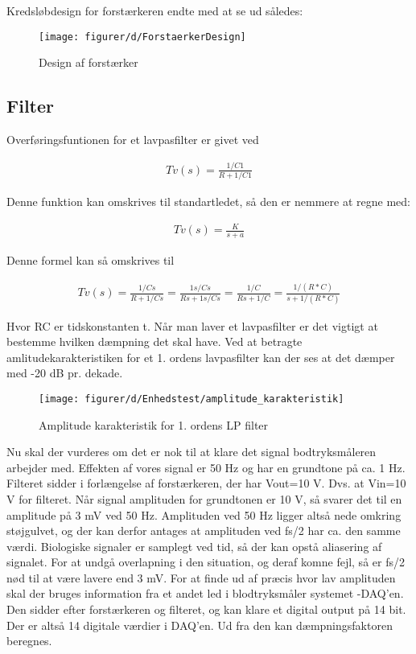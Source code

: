 Kredsløbdesign for forstærkeren endte med at se ud således:

\begin{figure}[H]
    \centering
    \texttt{[image: figurer/d/ForstaerkerDesign]}
    \caption{Design af forstærker}
    \label{figtest_HW2}
\end{figure}

\subsection{Filter}
Overføringsfuntionen for et lavpasfilter er givet ved

\begin{align}
Tv(s)=\frac{{1}/C1}{R+{1}/C1}
\end{align}

Denne funktion kan omskrives til standartledet, så den er nemmere at regne med:

\begin{align}
Tv(s)=\frac{K}{s + a}
\end{align}

Denne formel kan så omskrives til

\begin{align}
Tv(s)=\frac{{1}/Cs}{R+{1}/Cs} = \frac{{1s}/Cs}{Rs+{1s}/Cs} = \frac{{1}/C}{Rs+{1}/C} = \frac{{1}/(R*C)}{s+{1}/(R*C)}
\end{align}

Hvor RC er tidskonstanten t.
Når man laver et lavpasfilter er det vigtigt at bestemme hvilken dæmpning det skal have. 
Ved at betragte amlitudekarakteristiken for et 1. ordens lavpasfilter kan der ses at det dæmper med -20 dB pr. dekade.

\begin{figure}[H]
    \centering
    \texttt{[image: figurer/d/Enhedstest/amplitude\_karakteristik]}
    \caption{Amplitude karakteristik for 1. ordens LP filter}
    \label{figtest_LP}
\end{figure}

Nu skal der vurderes om det er nok til at klare det signal bodtryksmåleren arbejder med.
Effekten af vores signal er 50 Hz og har en grundtone på ca. 1 Hz. 
Filteret sidder i forlængelse af forstærkeren, der har Vout=10 V. Dvs. at Vin=10 V for filteret. 
Når signal amplituden for grundtonen er 10 V, så svarer det til en amplitude på 3 mV ved 50 Hz. 
Amplituden ved 50 Hz ligger altså nede omkring støjgulvet, og der kan derfor antages at amplituden ved fs/2 har ca. den samme værdi.
Biologiske signaler er samplegt ved tid, så der kan opstå aliasering af signalet. 
For at undgå overlapning i den situation, og deraf komne fejl, så er fs/2 nød til at være lavere end 3 mV.
For at finde ud af præcis hvor lav amplituden skal der bruges information fra et andet led i blodtryksmåler systemet -DAQ'en. 
Den sidder efter forstærkeren og filteret, og kan klare et digital output på 14 bit. 
Der er altså 14 digitale værdier i DAQ'en. Ud fra den kan dæmpningsfaktoren beregnes.

